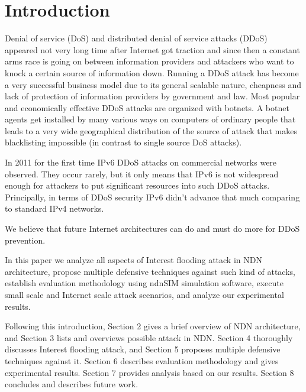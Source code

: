 \section{Introduction \label{intro}}
Denial of service (DoS) and distributed denial of service attacks (DDoS) appeared not very long time after Internet got traction and since then a constant arms race is going on between information providers and attackers who want to knock a certain source of information down. Running a DDoS attack has become a very successful business model due to its general scalable nature, cheapness and lack of protection of information providers by government and law. Most popular and economically effective DDoS attacks are organized with botnets. A botnet agents get installed by many various ways on computers of ordinary people that leads to a very wide geographical distribution of the source of attack that makes blacklisting impossible (in contrast to single source DoS attacks).

In 2011 for the first time IPv6 DDoS attacks on commercial networks were observed. They occur rarely, but it only means that IPv6 is not widespread enough for attackers to put significant resources into such DDoS attacks. Principally, in terms of DDoS security IPv6 didn't advance that much comparing to standard IPv4 networks.

We believe that future Internet architectures can do and must do more for DDoS prevention.
  

In this paper we analyze all aspects of Interest flooding attack in NDN architecture, propose multiple defensive techniques against such kind of attacks, establish evaluation methodology using ndnSIM simulation software, execute small scale and Internet scale attack scenarios, and analyze our experimental results.

Following this introduction, Section 2 gives a brief overview of NDN architecture, and Section 3 lists and overviews possible attack in NDN. Section 4 thoroughly discusses Interest flooding attack, and Section 5 proposes multiple defensive techniques against it. Section 6 describes evaluation methodology and gives experimental results. Section 7 provides analysis based on our results. Section 8 concludes and describes future work.



